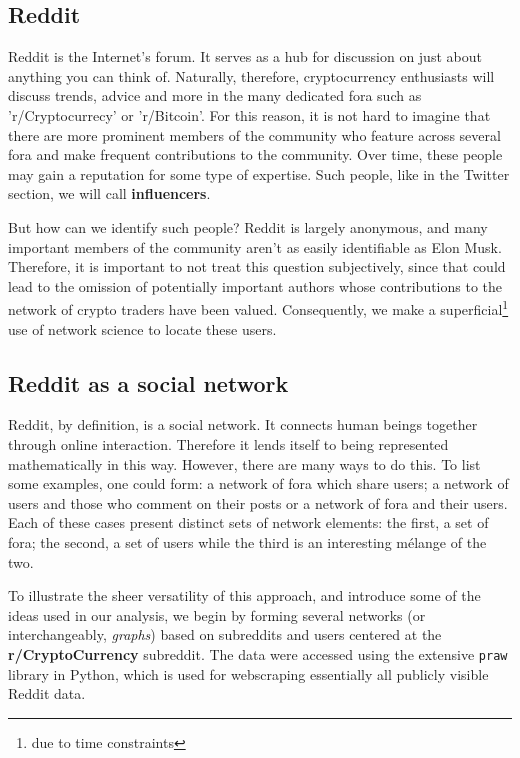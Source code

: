 \documentclass[twoside]{report}
\newcommand{\code}{\texttt}
\begin{document}
\begin{spacing}{1}
\section{Reddit}\label{reddit}
Reddit is the Internet's forum. It serves as a hub for discussion on just about anything you can think of. Naturally, therefore, cryptocurrency enthusiasts will discuss trends, advice and more in the many dedicated fora such as 'r/Cryptocurrecy' or 'r/Bitcoin'. For this reason, it is not hard to imagine that there are more prominent members of the community who feature across several fora and make frequent contributions to the community. Over time, these people may gain a reputation for some type of expertise. Such people, like in the Twitter section, we will call  \textbf{influencers}. 

But how can we identify such people? Reddit is largely anonymous, and many important members of the community aren't as easily identifiable as Elon Musk. Therefore, it is important to not treat this question subjectively, since that could lead to the omission of potentially important authors whose contributions to the network of crypto traders have been valued. Consequently, we make a superficial\footnote{due to time constraints} use of network science to locate these users. 

\subsection{Reddit as a social network}\label{sec:redditSN}

Reddit, by definition, is a social network. It connects human beings together through online interaction. Therefore it lends itself to being represented mathematically in this way. However, there are many ways to do this. To list some examples, one could form: a network of fora which share users; a network of users and those who comment on their posts or a network of fora and their users. Each of these cases present distinct sets of network elements: the first, a set of fora; the second, a set of users while the third is an interesting mélange of the two. 

To illustrate the sheer versatility of this approach, and introduce some of the ideas used in our analysis, we begin by forming several networks (or interchangeably, \textit{graphs}) based on subreddits and users centered at the \textbf{r/CryptoCurrency} subreddit. The data were accessed using the extensive \code{praw} library in Python, which is used for webscraping essentially all publicly visible Reddit data. 


\end{spacing}
\end{document}
